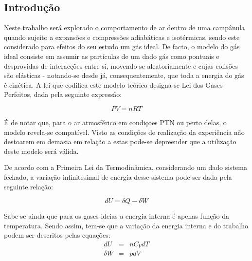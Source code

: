 \documentclass[9pt]{extarticle}
\begin{document}
\begin{multicols}{2}

\section{Introdução}

\par Neste trabalho será explorado o comportamento de ar dentro de uma campânula quando sujeito a expansões e compressões adiabáticas e isotérmicas, sendo este considerado para efeitos do seu estudo um gás ideal. De facto, o modelo do gás ideal consiste em assumir as partículas de um dado gás como pontuais e desprovidas de interacções entre si, movendo-se aleatoriamente e cujas colisões são elásticas - notando-se desde já, consequentemente, que toda a energia do gás é cinética. A lei que codifica este modelo teórico designa-se Lei dos Gases Perfeitos, dada pela seguinte expressão:

\begin{equation}
PV = nRT
\end{equation}
\par{}

\par É de notar que, para o ar atmosférico em condiçoes PTN ou perto delas, o modelo revela-se compatível. Visto as condições de realização da experiência não destoarem em demasia em relação a estas pode-se depreender que a utilização deste modelo será válida.

\par De acordo com a Primeira Lei da Termodinâmica, considerando um dado sistema fechado, a variação infinitesimal de energia desse sistema pode ser dada pela seguinte relação:

\begin{equation}
dU = \delta Q - \delta W 
\end{equation}
\par{}

\par Sabe-se ainda que para os gases ideias a energia interna é apenas função da temperatura. Sendo assim, tem-se que a variação da energia interna e do trabalho podem ser descritos pelas equações:
\begin{eqnarray}
dU &=& n C_V dT \\
\delta W &=& p dV
\end{eqnarray}


\end{multicols}
\end{document}
